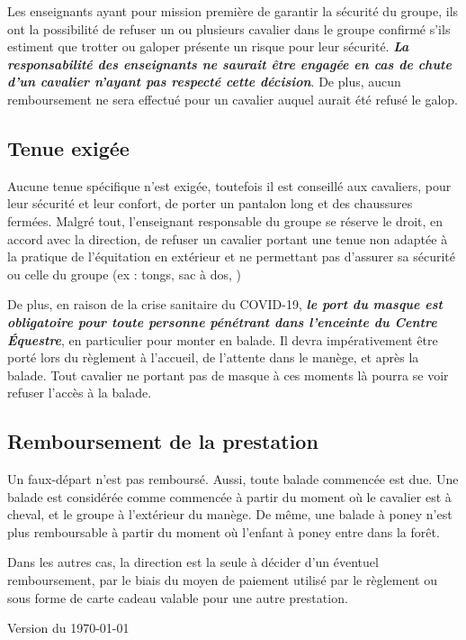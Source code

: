 \documentclass[11pt,a4paper]{article}
\renewcommand{\emph}[1]{\textit{\textbf{#1}}}
\begin{document}
Les enseignants ayant pour mission première de garantir la sécurité du groupe, ils ont la possibilité de refuser un ou plusieurs cavalier dans le groupe confirmé s'ils estiment que trotter ou galoper présente un risque pour leur sécurité. \emph{La responsabilité des enseignants ne saurait être engagée en cas de chute d'un cavalier n'ayant pas respecté cette décision}. De plus, aucun remboursement ne sera effectué pour un cavalier auquel aurait été refusé le galop.

\subsection*{Tenue exigée}
Aucune tenue spécifique n'est exigée, toutefois il est conseillé aux cavaliers, pour leur sécurité et leur confort, de porter un pantalon long et des chaussures fermées. Malgré tout, l'enseignant responsable du groupe se réserve le droit, en accord avec la direction, de refuser un cavalier portant une tenue non adaptée à la pratique de l'équitation en extérieur et ne permettant pas d'assurer sa sécurité ou celle du groupe (ex : tongs, sac à dos, )

De plus, en raison de la crise sanitaire du COVID-19, \emph{le port du masque est obligatoire pour toute personne pénétrant dans l'enceinte du Centre Équestre}, en particulier pour monter en balade. Il devra impérativement être porté lors du règlement à l'accueil, de l'attente dans le manège, et après la balade. Tout cavalier ne portant pas de masque à ces moments là pourra se voir refuser l'accès à la balade.

\subsection*{Remboursement de la prestation}
Un faux-départ n'est pas remboursé. Aussi, toute balade commencée est due. Une balade est considérée comme \og commencée \fg{} à partir du moment où le cavalier est à cheval, et le groupe à l'extérieur du manège. De même, une balade à poney n'est plus remboursable à partir du moment où l'enfant à poney entre dans la forêt.

Dans les autres cas, la direction est la seule à décider d'un éventuel remboursement, par le biais du moyen de paiement utilisé par le règlement ou sous forme de \og carte cadeau \fg{} valable pour une autre prestation.

\vfill
\begin{flushright}
	Version du \today
\end{flushright}
\end{document}
